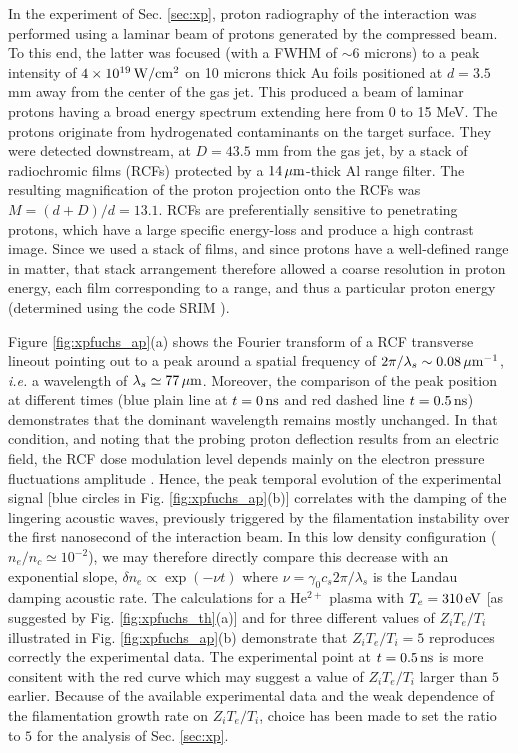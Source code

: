\documentclass[
 reprint,
 superscriptaddress,
 amsmath,amssymb,
 aps,
]{revtex4-1}
\def\tc{\textcolor{red}}
\begin{document}
In the experiment of Sec. \ref{sec:xp},
proton radiography of the interaction was performed using a laminar beam of protons generated by the compressed beam.
To this end, the latter was focused (with a FWHM of $\sim 6$ microns) to a peak intensity of $4\times 10^{19}\, \rm W/cm^2$ on 10 microns thick Au foils positioned at $d=3.5$ mm away from the center of the gas jet. This produced  \cite{PRL_Snavely_2000} a beam of laminar protons having a broad energy spectrum extending here from 0 to 15 MeV. The protons originate from hydrogenated contaminants on the target surface. They were detected downstream, at $D=43.5$ mm from the gas jet, by a stack of radiochromic films (RCFs) \cite{Bolton_2014}  protected by a $14\, \rm \mu m$-thick Al range filter. The resulting magniﬁcation of the proton projection onto the RCFs was $M=(d+D)/d =13.1$. RCFs are preferentially sensitive to penetrating protons, which have a large specific energy-loss and produce a high contrast image. Since we used a stack of films, and since protons have a well-defined range in matter, that stack arrangement therefore allowed a coarse resolution in proton energy, each film corresponding to a range, and thus a particular proton energy (determined using the code SRIM \cite{Ziegler_2010}). 

Figure \ref{fig:xpfuchs_ap}(a) shows the Fourier transform of a RCF transverse lineout pointing out to a peak around a spatial frequency of  $2\pi/\lambda_s\sim 0.08\, \rm \mu m^{-1}$, \emph{i.e.} a wavelength of $\lambda_s \simeq 77\, \rm \mu m$.
Moreover, the comparison of the peak position at different times (blue plain line at $t=0\,\rm ns$ and red dashed line $t=0.5\,\rm ns$) demonstrates that the dominant wavelength remains mostly unchanged.  In that condition, and noting that the probing proton deflection results from an electric field, the RCF dose modulation level depends mainly on the electron pressure fluctuations amplitude \cite[]{RSI_protograhyb}.
Hence, the peak temporal evolution of the experimental signal [blue circles in Fig. \ref{fig:xpfuchs_ap}(b)] correlates with the damping of the lingering acoustic waves, previously triggered by the filamentation instability over the first nanosecond of  the interaction beam.
In this low density configuration ($n_e/n_c\simeq10^{-2}$), 
we may therefore directly compare this decrease with an exponential slope, $\delta n_e \propto \exp(-\nu t)$ where $\nu = \gamma_0 c_s 2\pi/\lambda_s$ is the Landau damping acoustic rate. The calculations for a He$^{2+}$ plasma with \tc{$T_e=310\, \rm eV$} [as suggested by  Fig. \ref{fig:xpfuchs_th}(a)] and  for three different values of $Z_iT_e/T_i$ illustrated in  Fig. \ref{fig:xpfuchs_ap}(b) demonstrate that $Z_iT_e/T_i=5$ reproduces correctly the experimental data. The experimental point at $t=0.5\,\rm ns$ is more consitent with the red curve which may suggest a value of  $Z_iT_e/T_i $ larger than $5$ earlier. Because of the available experimental data and the weak dependence of the filamentation growth rate on $Z_iT_e/T_i$, choice has been made to set the ratio to  $5$ for the analysis of Sec. \ref{sec:xp}.


\end{document}
